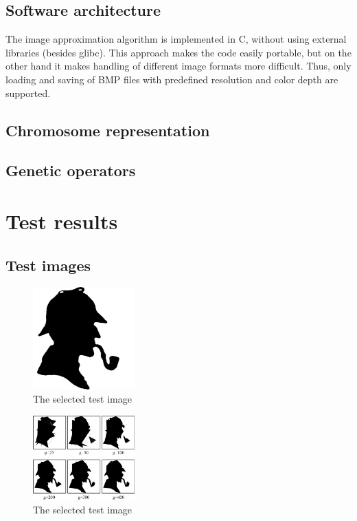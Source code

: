 \documentclass[conference]{IEEEtran}
\begin{document}
\subsection{Software architecture}

The image approximation algorithm is implemented in C,
without using external libraries (besides glibc). This
approach makes the code easily portable, but on the other
hand it makes handling of different image formats more
difficult. Thus, only loading and saving of BMP files
with predefined resolution and color depth are supported.

\subsection{Chromosome representation}

\subsection{Genetic operators}


\section{Test results}

\subsection{Test images}

\begin{figure}[htbp]
	\centering
	\includegraphics[width=0.35\textwidth]{fig/sherlock-orig.png}
	\caption{The selected test image}
	\label{sherlock-orig}
\end{figure}

\begin{figure}[htbp]
	\centering
	\includegraphics[width=0.35\textwidth]{fig/sherlock6.png}
	\caption{The selected test image}
	\label{sherlock-6}
\end{figure}
\end{document}
